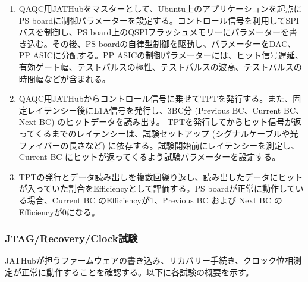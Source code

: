 \begin{enumerate}
    \item QAQC用JATHubをマスターとして、Ubuntu上のアプリケーションを起点にPS boardに制御パラメーターを設定する。コントロール信号を利用してSPIバスを制御し、PS board上のQSPIフラッシュメモリーにパラメーターを書き込む。その後、PS boardの自律型制御を駆動し、パラメーターをDAC、PP ASICに分配する。PP ASICの制御パラメーターには、ヒット信号遅延、有効ゲート幅、テストパルスの極性、テストパルスの波高、テストバルスの時間幅などが含まれる。
    \baselineskip

    \item QAQC用JATHubからコントロール信号に乗せてTPTを発行する。また、固定レイテンシー後にL1A信号を発行し、3BC分 (Previous BC、Current BC、Next BC) のヒットデータを読み出す。
    TPTを発行してからヒット信号が返ってくるまでのレイテンシーは、試験セットアップ (シグナルケーブルや光ファイバーの長さなど) に依存する。試験開始前にレイテンシーを測定し、Current BC にヒットが返ってくるよう試験パラメーターを設定する。
    \baselineskip

    \item TPTの発行とデータ読み出しを複数回繰り返し、読み出したデータにヒットが入っていた割合をEfficiencyとして評価する。PS boardが正常に動作している場合、Current BC のEfficiencyが1、Previous BC および Next BC のEfficiencyが0になる。
    \baselineskip

\end{enumerate}



\subsubsection{JTAG/Recovery/Clock試験}
\baselineskip
\label{subsubsec_jtag}
JATHubが担うファームウェアの書き込み、リカバリー手続き、クロック位相測定が正常に動作することを確認する。以下に各試験の概要を示す。

